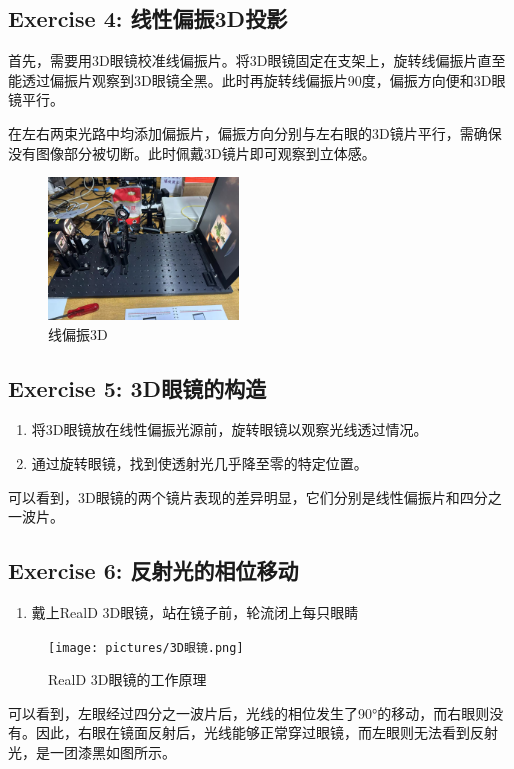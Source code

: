 \documentclass{ctexart}
\begin{document}
\subsection{Exercise 4: 线性偏振3D投影}
首先，需要用3D眼镜校准线偏振片。将3D眼镜固定在支架上，旋转线偏振片直至能透过偏振片观察到3D眼镜全黑。此时再旋转线偏振片90度，偏振方向便和3D眼镜平行。

在左右两束光路中均添加偏振片，偏振方向分别与左右眼的3D镜片平行，需确保没有图像部分被切断。此时佩戴3D镜片即可观察到立体感。
\begin{figure}[H]
    \centering
    \includegraphics[width=0.45\textwidth,height=0.3\textwidth]{pictures/微信图片_20241212140320.jpg}
    \caption{线偏振3D}
\end{figure}

\subsection{Exercise 5: 3D眼镜的构造}
\begin{enumerate}
    \item 将3D眼镜放在线性偏振光源前，旋转眼镜以观察光线透过情况。
    \item 通过旋转眼镜，找到使透射光几乎降至零的特定位置。
\end{enumerate}
可以看到，3D眼镜的两个镜片表现的差异明显，它们分别是线性偏振片和四分之一波片。

\subsection{Exercise 6: 反射光的相位移动}
\begin{enumerate}
    \item 戴上RealD 3D眼镜，站在镜子前，轮流闭上每只眼睛
\end{enumerate}
\begin{figure}[H]
    \centering
    \texttt{[image: pictures/3D眼镜.png]}
    \caption{RealD 3D眼镜的工作原理}
\end{figure}
可以看到，左眼经过四分之一波片后，光线的相位发生了90°的移动，而右眼则没有。因此，右眼在镜面反射后，光线能够正常穿过眼镜，而左眼则无法看到反射光，是一团漆黑如图所示。
\end{document}
